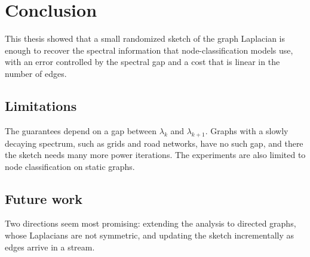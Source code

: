 \chapter{Conclusion}
\label{ch:conclusion}

This thesis showed that a small randomized sketch of the graph Laplacian is enough to recover the spectral information that node-classification models use, with an error controlled by the spectral gap and a cost that is linear in the number of edges.

\section{Limitations}

The guarantees depend on a gap between $\lambda_k$ and $\lambda_{k+1}$. Graphs with a slowly decaying spectrum, such as grids and road networks, have no such gap, and there the sketch needs many more power iterations. The experiments are also limited to node classification on static graphs.

\section{Future work}

Two directions seem most promising: extending the analysis to directed graphs, whose Laplacians are not symmetric, and updating the sketch incrementally as edges arrive in a stream.
